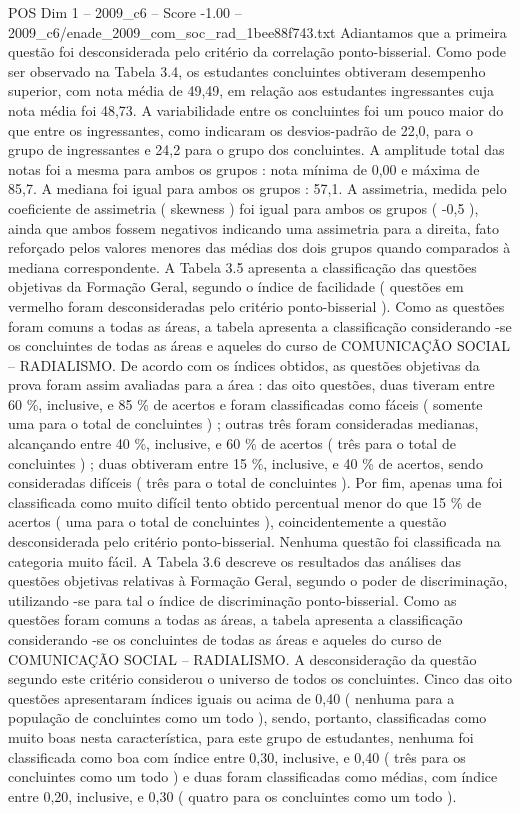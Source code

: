 \begin{textsample}{POS Dim 1 – 2009\_c6 – Score -1.00 – 2009\_c6/enade\_2009\_com\_soc\_rad\_1bee88f743.txt}
Adiantamos que a primeira questão foi desconsiderada pelo critério da correlação ponto-bisserial.
Como pode ser observado na Tabela 3.4, os estudantes concluintes obtiveram desempenho superior, com nota média de 49,49, em relação aos estudantes ingressantes cuja nota média foi 48,73.
A variabilidade entre os concluintes foi um pouco maior do que entre os ingressantes, como indicaram os desvios-padrão de 22,0, para o grupo de ingressantes e 24,2 para o grupo dos concluintes.
A amplitude total das notas foi a mesma para ambos os grupos : nota mínima de 0,00 e máxima de 85,7.
A mediana foi igual para ambos os grupos : 57,1.
A assimetria, medida pelo coeficiente de assimetria ( skewness ) foi igual para ambos os grupos ( -0,5 ), ainda que ambos fossem negativos indicando uma assimetria para a direita, fato reforçado pelos valores menores das médias dos dois grupos quando comparados à mediana correspondente.
A Tabela 3.5 apresenta a classificação das questões objetivas da Formação Geral, segundo o índice de facilidade ( questões em vermelho foram desconsideradas pelo critério ponto-bisserial ).
Como as questões foram comuns a todas as áreas, a tabela apresenta a classificação considerando -se os concluintes de todas as áreas e aqueles do curso de COMUNICAÇÃO SOCIAL – RADIALISMO.
De acordo com os índices obtidos, as questões objetivas da prova foram assim avaliadas para a área : das oito questões, duas tiveram entre 60 \%, inclusive, e 85 \% de acertos e foram classificadas como fáceis ( somente uma para o total de concluintes ) ; outras três foram consideradas medianas, alcançando entre 40 \%, inclusive, e 60 \% de acertos ( três para o total de concluintes ) ; duas obtiveram entre 15 \%, inclusive, e 40 \% de acertos, sendo consideradas difíceis ( três para o total de concluintes ).
Por fim, apenas uma foi classificada como muito difícil tento obtido percentual menor do que 15 \% de acertos ( uma para o total de concluintes ), coincidentemente a questão desconsiderada pelo critério ponto-bisserial.
Nenhuma questão foi classificada na categoria muito fácil.
A Tabela 3.6 descreve os resultados das análises das questões objetivas relativas à Formação Geral, segundo o poder de discriminação, utilizando -se para tal o índice de discriminação ponto-bisserial.
Como as questões foram comuns a todas as áreas, a tabela apresenta a classificação considerando -se os concluintes de todas as áreas e aqueles do curso de COMUNICAÇÃO SOCIAL – RADIALISMO.
A desconsideração da questão segundo este critério considerou o universo de todos os concluintes.
Cinco das oito questões apresentaram índices iguais ou acima de 0,40 ( nenhuma para a população de concluintes como um todo ), sendo, portanto, classificadas como muito boas nesta característica, para este grupo de estudantes, nenhuma foi classificada como boa com índice entre 0,30, inclusive, e 0,40 ( três para os concluintes como um todo ) e duas foram classificadas como médias, com índice entre 0,20, inclusive, e 0,30 ( quatro para os concluintes como um todo ).

\end{textsample}
